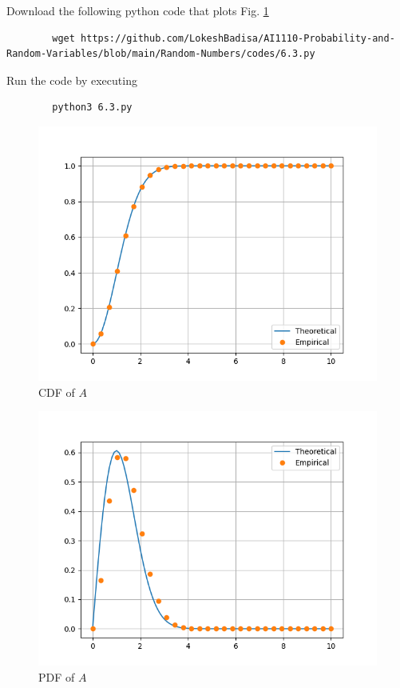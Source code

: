 \documentclass[journal,12pt,twocolumn]{IEEEtran}
\numberwithin{equation}{section}
\renewcommand\thesection{\arabic{section}}
\begin{document}
\begin{enumerate}[label=\thesection.\arabic*,ref=\thesection.\theenumi]
	Download the following python code that plots Fig. \ref{fig-6.3} 
	\begin{lstlisting}
		wget https://github.com/LokeshBadisa/AI1110-Probability-and-Random-Variables/blob/main/Random-Numbers/codes/6.3.py
	\end{lstlisting}
	Run the code by executing
	\begin{lstlisting}
		python3 6.3.py
	\end{lstlisting}
	\begin{figure}
		\centering
		\includegraphics[width=\columnwidth]{./figs/6.3.png}
		\caption{CDF of $A$}
		\label{fig-6.3}
	\end{figure}
	\begin{figure}
		\centering
		\includegraphics[width=\columnwidth]{./figs/6.4.png}
		\caption{PDF of $A$}
		\label{fig-6.4}
	\end{figure}
	

\end{enumerate}
\end{document}

